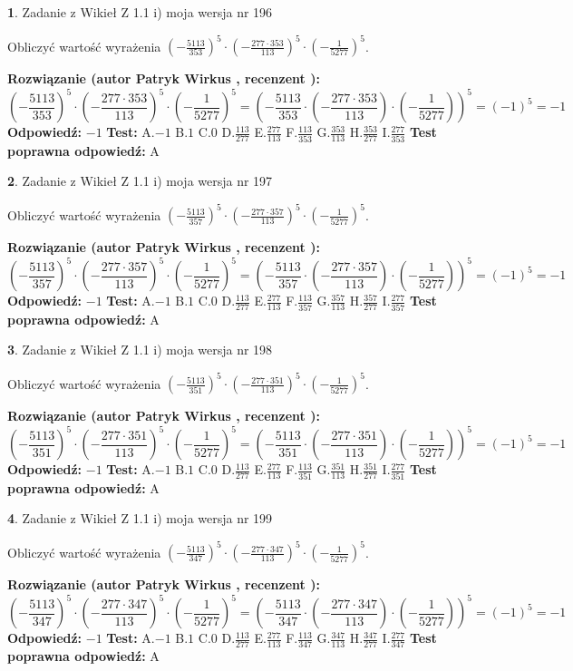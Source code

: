 \documentclass[12pt, a4paper]{article}
\theoremstyle{definition} %
\newtheorem{zad}{}
\newcommand{\zadStart}[1]{\begin{zad}#1\newline}
\newcommand{\zadStop}{\end{zad}}
\newcommand{\rozwStart}[2]{\noindent \textbf{Rozwiązanie (autor #1 , recenzent #2): }\newline}
\newcommand{\rozwStop}{\newline}
\newcommand{\odpStart}{\noindent \textbf{Odpowiedź:}\newline}
\newcommand{\odpStop}{\newline}
\newcommand{\testStart}{\noindent \textbf{Test:}\newline}
\newcommand{\testStop}{\newline}
\newcommand{\kluczStart}{\noindent \textbf{Test poprawna odpowiedź:}\newline}
\newcommand{\kluczStop}{\newline}
\begin{document}
\zadStart{Zadanie z Wikieł Z 1.1 i) moja wersja nr 196}

Obliczyć wartość wyrażenia $(-\frac{5113}{353})^{5} \cdot (-\frac{277 \cdot 353}{113})^{5} \cdot (-\frac{1}{5277})^{5}$.
\zadStop
\rozwStart{Patryk Wirkus}{}
$$(-\frac{5113}{353})^{5} \cdot (-\frac{277 \cdot 353}{113})^{5} \cdot (-\frac{1}{5277})^{5} = (-\frac{5113}{353} \cdot (-\frac{277 \cdot 353}{113}) \cdot (-\frac{1}{5277}))^{5} = (-1)^{5} = -1$$
\rozwStop
\odpStart
$-1$
\odpStop
\testStart
A.$-1$ B.$1$ C.$0$ D.$\frac{113}{277}$ E.$\frac{277}{113}$
F.$\frac{113}{353}$ G.$\frac{353}{113}$
H.$\frac{353}{277}$
I.$\frac{277}{353}$
\testStop
\kluczStart
A
\kluczStop



\zadStart{Zadanie z Wikieł Z 1.1 i) moja wersja nr 197}

Obliczyć wartość wyrażenia $(-\frac{5113}{357})^{5} \cdot (-\frac{277 \cdot 357}{113})^{5} \cdot (-\frac{1}{5277})^{5}$.
\zadStop
\rozwStart{Patryk Wirkus}{}
$$(-\frac{5113}{357})^{5} \cdot (-\frac{277 \cdot 357}{113})^{5} \cdot (-\frac{1}{5277})^{5} = (-\frac{5113}{357} \cdot (-\frac{277 \cdot 357}{113}) \cdot (-\frac{1}{5277}))^{5} = (-1)^{5} = -1$$
\rozwStop
\odpStart
$-1$
\odpStop
\testStart
A.$-1$ B.$1$ C.$0$ D.$\frac{113}{277}$ E.$\frac{277}{113}$
F.$\frac{113}{357}$ G.$\frac{357}{113}$
H.$\frac{357}{277}$
I.$\frac{277}{357}$
\testStop
\kluczStart
A
\kluczStop



\zadStart{Zadanie z Wikieł Z 1.1 i) moja wersja nr 198}

Obliczyć wartość wyrażenia $(-\frac{5113}{351})^{5} \cdot (-\frac{277 \cdot 351}{113})^{5} \cdot (-\frac{1}{5277})^{5}$.
\zadStop
\rozwStart{Patryk Wirkus}{}
$$(-\frac{5113}{351})^{5} \cdot (-\frac{277 \cdot 351}{113})^{5} \cdot (-\frac{1}{5277})^{5} = (-\frac{5113}{351} \cdot (-\frac{277 \cdot 351}{113}) \cdot (-\frac{1}{5277}))^{5} = (-1)^{5} = -1$$
\rozwStop
\odpStart
$-1$
\odpStop
\testStart
A.$-1$ B.$1$ C.$0$ D.$\frac{113}{277}$ E.$\frac{277}{113}$
F.$\frac{113}{351}$ G.$\frac{351}{113}$
H.$\frac{351}{277}$
I.$\frac{277}{351}$
\testStop
\kluczStart
A
\kluczStop



\zadStart{Zadanie z Wikieł Z 1.1 i) moja wersja nr 199}

Obliczyć wartość wyrażenia $(-\frac{5113}{347})^{5} \cdot (-\frac{277 \cdot 347}{113})^{5} \cdot (-\frac{1}{5277})^{5}$.
\zadStop
\rozwStart{Patryk Wirkus}{}
$$(-\frac{5113}{347})^{5} \cdot (-\frac{277 \cdot 347}{113})^{5} \cdot (-\frac{1}{5277})^{5} = (-\frac{5113}{347} \cdot (-\frac{277 \cdot 347}{113}) \cdot (-\frac{1}{5277}))^{5} = (-1)^{5} = -1$$
\rozwStop
\odpStart
$-1$
\odpStop
\testStart
A.$-1$ B.$1$ C.$0$ D.$\frac{113}{277}$ E.$\frac{277}{113}$
F.$\frac{113}{347}$ G.$\frac{347}{113}$
H.$\frac{347}{277}$
I.$\frac{277}{347}$
\testStop
\kluczStart
A
\kluczStop
\end{document}

